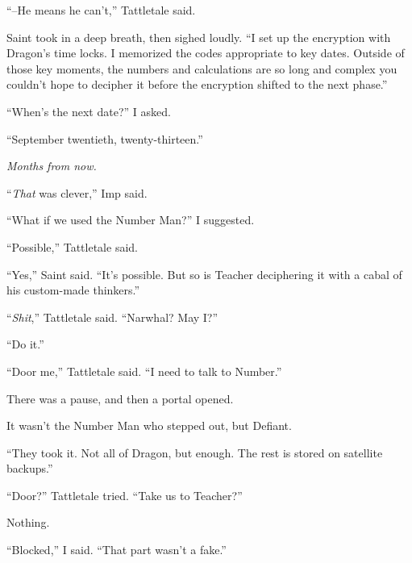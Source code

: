 ``--He means he can't,'' Tattletale said.



Saint took in a deep breath, then sighed loudly.  ``I set up the encryption with Dragon's time locks.  I memorized the codes appropriate to key dates.  Outside of those key moments, the numbers and calculations are so long and complex you couldn't hope to decipher it before the encryption shifted to the next phase.''



``When's the next date?'' I asked.



``September twentieth, twenty-thirteen.''



\emph{Months from now.}



``\emph{That} was clever,'' Imp said.



``What if we used the Number Man?'' I suggested.



``Possible,'' Tattletale said.



``Yes,'' Saint said.  ``It's possible.  But so is Teacher deciphering it with a cabal of his custom-made thinkers.''



``\emph{Shit},'' Tattletale said.  ``Narwhal?  May I?''



``Do it.''



``Door me,'' Tattletale said.  ``I need to talk to Number.''



There was a pause, and then a portal opened.



It wasn't the Number Man who stepped out, but Defiant.



``They took it.  Not all of Dragon, but enough.  The rest is stored on satellite backups.''



``Door?''  Tattletale tried.  ``Take us to Teacher?''



Nothing.



``Blocked,'' I said.  ``That part wasn't a fake.''



